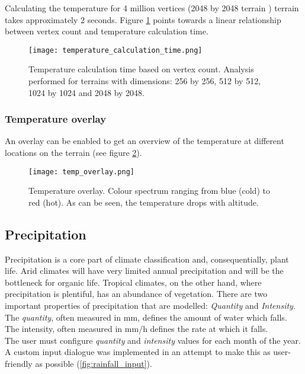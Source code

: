 Calculating the temperature for 4 million vertices (2048 by 2048 terrain ) terrain takes approximately 2 seconds. Figure \ref{fig:temperature_calculation_time} points towards a linear relationship between vertex count and temperature calculation time.

\begin{figure}
\center
	\texttt{[image: temperature\_calculation\_time.png]}
	\caption{ Temperature calculation time based on vertex count. Analysis performed for terrains with dimensions: 256 by 256, 512 by 512, 1024 by 1024 and 2048 by 2048. }
	\label{fig:temperature_calculation_time}
\end{figure}

\subsubsection{Temperature overlay}

An overlay can be enabled to get an overview of the temperature at different locations on the terrain (see figure \ref{fig:temp_overlay}).

\begin{figure}
\center
	\texttt{[image: temp\_overlay.png]}
	\caption{ Temperature overlay. Colour spectrum ranging from blue (cold) to red (hot). As can be seen, the temperature drops with altitude.}
	\label{fig:temp_overlay}
\end{figure}

\subsection{Precipitation} \label{sec:precipitation}

Precipitation is a core part of climate classification and, consequentially, plant life. Arid climates will have very limited annual precipitation and will be the bottleneck for organic life. Tropical climates, on the other hand, where precipitation is plentiful, has an abundance of vegetation. There are two important properties of precipitation that are modelled: \textit{Quantity} and \textit{Intensity}. The \textit{quantity}, often measured in mm, defines the amount of water which falls. The intensity, often measured in mm/h defines the rate at which it falls.\\

The user must configure \textit{quantity} and \textit{intensity} values for each month of the year. A custom input dialogue was implemented in an attempt to make this as user-friendly as possible (\ref{fig:rainfall_input}).

